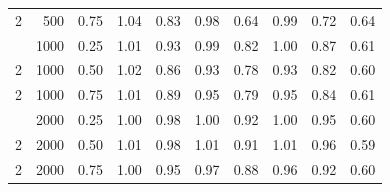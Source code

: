 \begin{table}[t]
\begin{tabular}{rrr r rrrrr r}
2 & 500 & 0.75 & 1.04 & 0.83 & 0.98 & 0.64 & 0.99 & 0.72 & 0.64 \\
\addlinespace
2 & 1000 & 0.25 & 1.01 & 0.93 & 0.99 & 0.82 & 1.00 & 0.87 & 0.61 \\
2 & 1000 & 0.50 & 1.02 & 0.86 & 0.93 & 0.78 & 0.93 & 0.82 & 0.60 \\
2 & 1000 & 0.75 & 1.01 & 0.89 & 0.95 & 0.79 & 0.95 & 0.84 & 0.61 \\
\addlinespace
2 & 2000 & 0.25 & 1.00 & 0.98 & 1.00 & 0.92 & 1.00 & 0.95 & 0.60 \\
2 & 2000 & 0.50 & 1.01 & 0.98 & 1.01 & 0.91 & 1.01 & 0.96 & 0.59 \\
2 & 2000 & 0.75 & 1.00 & 0.95 & 0.97 & 0.88 & 0.96 & 0.92 & 0.60 \\
\bottomrule\end{tabular}\end{table}
